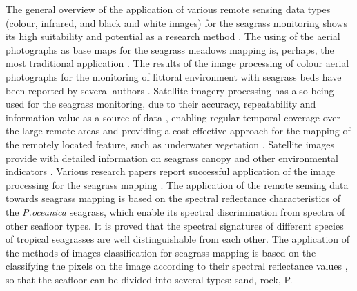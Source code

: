 \documentclass[10pt, a4paper]{article}
\begin{document}
The general overview of the application of various remote sensing data types (colour,
infrared, and black and white images) for the seagrass monitoring shows its high suitability and
potential as a research method \cite{Pasqualini01,Matarrese06}\label{Pasqualini01}\label{Matarrese06}. The using of the aerial
photographs as base maps for the seagrass meadows mapping is, perhaps, the most traditional
application \cite{McKenzie03,Kendrick00,Pasqualini99}\label{McKenzie03} \label{Kendrick00} \label{Pasqualini99}. The results of the image
processing of colour aerial photographs for the monitoring of littoral environment with seagrass beds
have been reported by several authors \cite{Kelly80,Walker89,Green96}\label{Kelly80} \label{Walker89} \label{Green96}.
Satellite imagery processing has also being used for the seagrass monitoring, due to their accuracy,
repeatability and information value as a source of data \cite{Dekker05b}\label{Dekker05b}, enabling regular temporal
coverage over the large remote areas and providing a cost-effective approach for the mapping of the
remotely located feature, such as underwater vegetation \cite{Jensen95}\label{Jensen95}. Satellite images provide
with detailed information on seagrass canopy and other environmental indicators \cite{Fyfe03}\label{Fyfe03}.
Various research papers report successful application of the image processing for the
seagrass mapping \cite{Calvo03,Dekker05a,Fornes06,Green96,Jackson07,Jensen95,Kendrick00,Lyzenga81,Malthus03,Matarrese08,Mount03,Pasqualini01,Pasqualini99,Pasqualini98a,Pergent-Martini06,Ralph05,Ribed02,Short01,Walker89}\label{Calvo03}\label{Dekker05a}\label{Fornes06}\label{Green96}\label{Jackson07}\label{Jensen95}\label{Kendrick00} \label{Lyzenga81}\label{Malthus03}\label{Matarrese08}\label{Mount03}\label{Pasqualini01}\label{Pasqualini99}\label{Pasqualini98a}\label{Pergent-Martini06}\label{Ralph05}\label{Ribed02}\label{Short01}\label{Walker89}. The application of the remote sensing data towards seagrass mapping is based on the spectral reflectance
 characteristics of the \textit{P.oceanica} seagrass, which enable its spectral discrimination from spectra of other seafloor types. 
It is proved \cite{Thorhaug07} \label{Thorhaug07} that the spectral signatures of different species of tropical seagrasses are well
distinguishable from each other. The application of the methods of images classification for seagrass
mapping is based on the classifying the pixels on the image according to their spectral reflectance
values \cite{Fornes06} \label{Fornes06}, so that the seafloor can be divided into several types: sand, rock, P.
\end{document}
